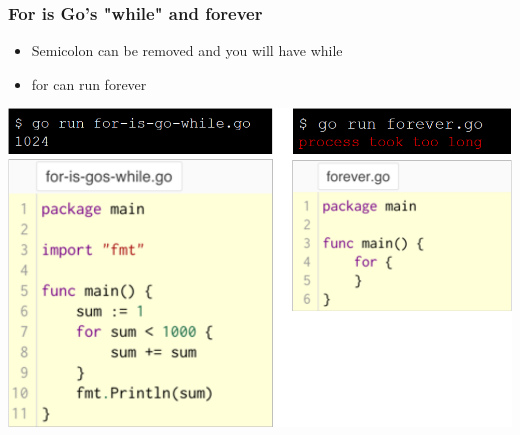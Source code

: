 \documentclass[14pt]{beamer}
\begin{document}
{
\begin{frame}
    \frametitle{For is Go's "while" and forever}
    \begin{itemize}
        \item Semicolon can be removed and you will have while
        \item for can run forever
    \end{itemize}
    \begin{center}
        \includegraphics[width=0.8\linewidth]{img/while.PNG}
    \end{center}
\end{frame}
}
\end{document}
